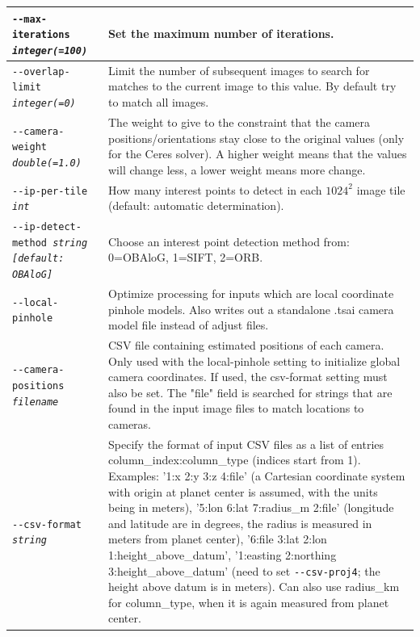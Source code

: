 \begin{longtable}{|l|p{7.5cm}|}
\texttt{-\/-max-iterations \textit{integer(=100)}} & Set the maximum
number of iterations. \\ \hline

\texttt{-\/-overlap-limit \textit{integer(=0)}} & Limit the number of
subsequent images to search for matches to the current image to this
value.  By default try to match all images.\\ \hline


\texttt{-\/-camera-weight \textit{double(=1.0)}} &
The weight to give to the constraint that the camera positions/orientations stay close to
the original values (only for the Ceres solver).  A higher weight means that the values will
change less, a lower weight means more change.
\\ \hline

\texttt{-\/-ip-per-tile \textit{int}} &
How many interest points to detect in each $1024^2$ image tile (default: automatic
determination).
\\ \hline

\texttt{-\/-ip-detect-method \textit{string [default: OBAloG]}} & Choose an interest point
detection method from: 0=OBAloG, 1=SIFT, 2=ORB. \\ \hline

\texttt{-\/-local-pinhole} & Optimize processing for inputs which are local coordinate pinhole models.
Also writes out a standalone .tsai camera model file instead of adjust files. \\ \hline

\texttt{-\/-camera-positions \textit{filename}} & CSV file containing estimated positions of each camera.
Only used with the local-pinhole setting to initialize global camera coordinates. If used,
the csv-format setting must also be set.  The "file" field is searched for strings that are found
in the input image files to match locations to cameras.\\ \hline

\texttt{-\/-csv-format \textit{string}} & Specify the format of input
CSV files as a list of entries column\_index:column\_type (indices start
from 1). Examples: '1:x 2:y 3:z 4:file' (a Cartesian coordinate system with
origin at planet center is assumed, with the units being in meters),
'5:lon 6:lat 7:radius\_m 2:file' (longitude and latitude are in degrees, the
radius is measured in meters from planet center), '6:file 3:lat 2:lon
1:height\_above\_datum', '1:easting 2:northing 3:height\_above\_datum'
(need to set \texttt{-\/-csv-proj4}; the height above datum is in
meters). Can also use radius\_km for column\_type, when it is again
measured from planet center.\\ \hline


\end{longtable}
